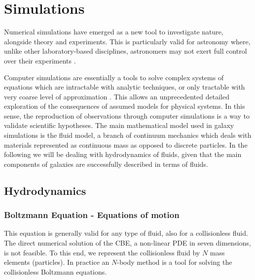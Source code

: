 
\chapter{Simulations}
\label{ch:simulations}

Numerical simulations have emerged as a new tool to investigate nature, alongside theory and experiments.
This is particularly valid for astronomy where, unlike other laboratory-based disciplines, astronomers may not exert full control over their experiments \citep{Heng2014}.

Computer simulations are essentially a tools to solve complex systems of equations which are intractable with analytic techniques, or only tractable with very coarse level of approximation \citep{Springel2016}.
This allows an unprecedented detailed exploration of the consequences of assumed models for physical systems. In this sense, the reproduction of observations through computer simulations is a way to validate scientific hypotheses.
The main mathematical model used in galaxy simulations is the fluid model, a branch of continuum mechanics which deals with materials represented as continuous mass as opposed to discrete particles.
In the following we will be dealing with hydrodynamics of fluids, given that the main components of galaxies are successfully described in terms of fluids.

\section{Hydrodynamics}

\subsection{Boltzmann Equation - Equations of motion}
This equation is generally valid for any type of fluid, also for a collisionless fluid.
The direct numerical solution of the CBE, a non-linear PDE in seven dimensions, is not feasible.
To this end, we represent the collisionless fluid by $N$ mass elements (particles).
In practice an $N$-body method is a tool for solving the collisionless Boltzmann equations.

